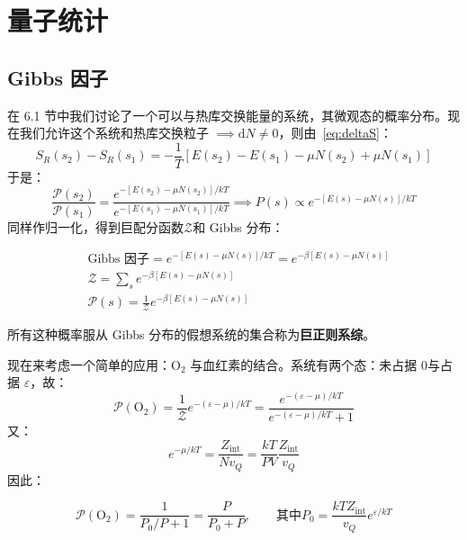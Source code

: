 \chapter{量子统计}

\section{Gibbs 因子}
在 6.1 节中我们讨论了一个可以与热库交换能量的系统，其微观态的概率分布。现在我们允许这个系统和热库交换粒子 $\implies \mathrm{d}N\neq 0$，则由~\eqref{eq:deltaS}：
\begin{equation}
    S_R(s_2)-S_R(s_1)
    =-\frac{1}{T}\left[E(s_2)-E(s_1)-\mu N(s_2)+\mu N(s_1)\right]
\end{equation}
于是：
\begin{equation}
\frac{\mathcal{P}(s_2)}{\mathcal{P}(s_1)}
=\frac{e^{-\left[E(s_2)-\mu N(s_2)\right]/kT}}{e^{-\left[E(s_1)-\mu N(s_1)\right]/kT}}
\implies
P(s)\propto e^{-\left[E(s)-\mu N(s)\right]/kT}
\end{equation}
同样作归一化，得到巨配分函数$\mathcal{Z}$和 Gibbs 分布：
\begin{definition}
    \begin{align}
        &\text{Gibbs 因子} = e^{-\left[E(s)-\mu N(s)\right]/kT} = e^{-\beta \left[E(s)-\mu N(s)\right]}\\
        &\mathcal{Z} = \sum_s e^{-\beta \left[E(s)-\mu N(s)\right]}\\
        &\mathcal{P}(s)=\frac{1}{\mathcal{Z}}e^{-\beta \left[E(s)-\mu N(s)\right]}
    \end{align}
\end{definition}
所有这种概率服从 Gibbs 分布的假想系统的集合称为\textbf{巨正则系综}。

现在来考虑一个简单的应用：$\mathrm{O_2}$ 与血红素的结合。系统有两个态：未占据 $0$与占据 $\varepsilon$，故：
\begin{equation}
    \mathcal{P}(\mathrm{O_2})
    =\frac{1}{\mathcal{Z}}e^{-(\varepsilon-\mu)/kT}
    =\frac{e^{-(\varepsilon-\mu)/kT}}{e^{-(\varepsilon-\mu)/kT}+1}
\end{equation}
又：
\begin{equation}
    e^{-\mu/kT}=\frac{Z_{\mathrm{int}}}{Nv_Q}=\frac{kT}{PV}\frac{Z_{\mathrm{int}}}{v_Q}
\end{equation}
因此：
\begin{corollary}[Langmuir 吸附]
    \begin{equation}
        \mathcal{P}(\mathrm{O_2})
        =\frac{1}{P_0/P+1}
        =\frac{P}{P_0+P},
        \qquad \text{其中}
        P_0=\frac{kTZ_{\mathrm{int}}}{v_Q}e^{\varepsilon/kT}
    \end{equation}
\end{corollary}


